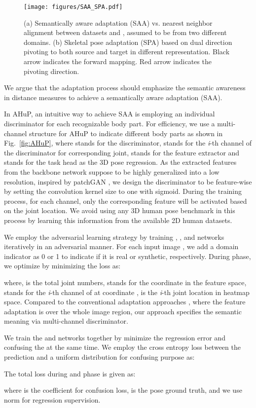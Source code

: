 \documentclass[twocolumn]{svjour3}          \smartqed  \usepackage{graphicx}
\newcommand{\figref}[1]{Fig.~\ref{#1}}
\newcommand{\figSAAandSPA}{
\begin{figure}
    \centering
    \texttt{[image: figures/SAA\_SPA.pdf]}
    \caption{(a) Semantically aware adaptation (SAA) vs. nearest neighbor alignment between datasets  and , assumed to be from two different domains. (b) Skeletal pose adaptation (SPA) based on dual direction pivoting to both source and target in different representation. Black arrow indicates the forward mapping. Red arrow indicates the pivoting direction.}
    \label{fig:SAAandSPA}
    \vspace{-.2in}
\end{figure}
}
\begin{document}
\figSAAandSPA
We argue that the adaptation process should emphasize the semantic awareness in distance measures to achieve a semantically aware adaptation (SAA). 




In AHuP, an intuitive way to achieve SAA is  employing an individual discriminator for each recognizable body part. For efficiency, we use a multi-channel structure for AHuP to indicate different body parts as shown in \figref{fig:AHuP}, where  stands for the discriminator,  stands for the \textit{i}-th channel of the discriminator for corresponding joint,   stands for the feature extractor and  stands for the task head as the 3D pose regression.  
As the extracted features from the backbone network   suppose to be highly generalized into a low  resolution, inspired by patchGAN \cite{isola2017image}, we design the discriminator  to be feature-wise by setting the  convolution kernel size to one with sigmoid. During the training process, for each channel, only the corresponding feature will be activated based on the joint location.  We avoid using any 3D human pose benchmark in this process by learning this information from the  available 2D human datasets. 


We employ the adversarial learning strategy by training  , ,  and  networks  iteratively in an adversarial manner.  
For each input image , we add a domain indicator  as 0 or 1 to indicate if it is real or synthetic, respectively.   During  phase, we optimize  by minimizing the   loss as: 


where,  is the total joint numbers,  stands for the coordinate in the feature space,   stands for the \textit{i}-th channel of  at coordinate ,
 is the \textit{i}-th joint location in heatmap space. Compared to the conventional adaptation approaches \cite{sun2016deep,tzeng2015simultaneous,tzeng2017adversarial}, where the feature adaptation is over the whole image region, our approach specifies the semantic meaning via multi-channel discriminator. 


We train the  and  networks together by minimize the regression error and confusing the  at the same time.  We employ the cross entropy loss between the  prediction and a uniform distribution for confusing purpose as:  
\vspace{-.3cm}


The total loss during  and  phase is given as: 
 
where  is the coefficient for confusion loss,  is the pose ground truth, and we use norm  for regression supervision. 
\end{document}
